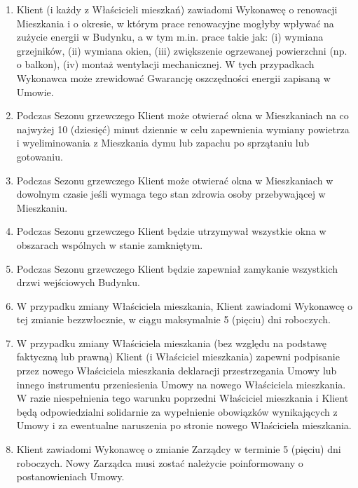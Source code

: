 \begin{multicols}{2}
\begin{enumerate}
	\item Klient (i każdy z Właścicieli mieszkań) zawiadomi Wykonawcę o renowacji Mieszkania i o okresie, w którym prace renowacyjne mogłyby wpływać na zużycie energii w Budynku, a w tym m.in. prace takie jak: (i) wymiana grzejników, (ii) wymiana okien, (iii) zwiększenie ogrzewanej powierzchni (np. o balkon), (iv) montaż wentylacji mechanicznej. W tych przypadkach Wykonawca może zrewidować Gwarancję oszczędności energii zapisaną w Umowie.
	\item Podczas Sezonu grzewczego Klient może otwierać okna w Mieszkaniach na co najwyżej 10 (dziesięć) minut dziennie w celu zapewnienia wymiany powietrza i wyeliminowania z Mieszkania dymu lub zapachu po sprzątaniu lub gotowaniu.
	\item Podczas Sezonu grzewczego Klient może otwierać okna w Mieszkaniach w dowolnym czasie jeśli wymaga tego stan zdrowia osoby przebywającej w Mieszkaniu.
	\item Podczas Sezonu grzewczego Klient będzie utrzymywał wszystkie okna w obszarach wspólnych w stanie zamkniętym.
	\item Podczas Sezonu grzewczego Klient będzie zapewniał zamykanie wszystkich drzwi wejściowych Budynku.
	\item W przypadku zmiany Właściciela mieszkania, Klient zawiadomi Wykonawcę o tej zmianie bezzwłocznie, w ciągu maksymalnie 5 (pięciu) dni roboczych.
	\item W przypadku zmiany Właściciela mieszkania (bez względu na podstawę faktyczną lub prawną) Klient (i Właściciel mieszkania) zapewni podpisanie przez nowego Właściciela mieszkania deklaracji przestrzegania Umowy lub innego instrumentu przeniesienia Umowy na nowego Właściciela mieszkania. W razie niespełnienia tego warunku poprzedni Właściciel mieszkania i Klient będą odpowiedzialni solidarnie za wypełnienie obowiązków wynikających z Umowy i za ewentualne naruszenia po stronie nowego Właściciela mieszkania.
	\item Klient zawiadomi Wykonawcę o zmianie Zarządcy w terminie 5 (pięciu) dni roboczych. Nowy Zarządca musi zostać należycie poinformowany o postanowieniach Umowy.
\end{enumerate}


\end{multicols}
